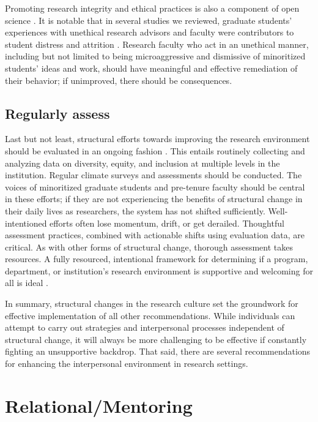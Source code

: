\documentclass[
  11pt,
]{book}
\begin{document}
Promoting research integrity and ethical practices is also a component of open science \citep{noauthor_open_2018}. It is notable that in several studies we reviewed, graduate students' experiences with unethical research advisors and faculty were contributors to student distress and attrition \citep{hall_falling_2022, kis_leaving_2022}. Research faculty who act in an unethical manner, including but not limited to being microaggressive and dismissive of minoritized students' ideas and work, should have meaningful and effective remediation of their behavior; if unimproved, there should be consequences.

\subsection{Regularly assess}\label{regularly-assess}

Last but not least, structural efforts towards improving the research environment should be evaluated in an ongoing fashion \citep{tung_making_2023}. This entails routinely collecting and analyzing data on diversity, equity, and inclusion at multiple levels in the institution. Regular climate surveys and assessments should be conducted. The voices of minoritized graduate students and pre-tenure faculty should be central in these efforts; if they are not experiencing the benefits of structural change in their daily lives as researchers, the system has not shifted sufficiently. Well-intentioned efforts often lose momentum, drift, or get derailed. Thoughtful assessment practices, combined with actionable shifts using evaluation data, are critical. As with other forms of structural change, thorough assessment takes resources. A fully resourced, intentional framework for determining if a program, department, or institution's research environment is supportive and welcoming for all is ideal \citep{galan_editorial_2021}.

In summary, structural changes in the research culture set the groundwork for effective implementation of all other recommendations. While individuals can attempt to carry out strategies and interpersonal processes independent of structural change, it will always be more challenging to be effective if constantly fighting an unsupportive backdrop. That said, there are several recommendations for enhancing the interpersonal environment in research settings.

\section{Relational/Mentoring}\label{relationalmentoring}
\end{document}
